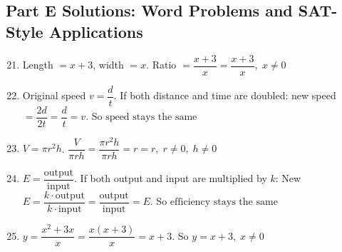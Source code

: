 \documentclass[12pt]{article}
\begin{document}
\subsection*{Part E Solutions: Word Problems and SAT-Style Applications}
\begin{enumerate}
  \setcounter{enumi}{20}
  \item Length \(= x+3\), width \(= x\).  
  Ratio \(= \dfrac{x+3}{x}
  = \boxed{\dfrac{x+3}{x}}, \; x \ne 0\)

  \item Original speed \(v = \dfrac{d}{t}\).  
  If both distance and time are doubled: new speed \(= \dfrac{2d}{2t} = \dfrac{d}{t} = v\).  
  So \(\boxed{\text{speed stays the same}}\)

  \item \(V = \pi r^2 h\).  
  \(\dfrac{V}{\pi r h}
  = \dfrac{\pi r^2 h}{\pi r h}
  = r
  = \boxed{r}, \; r \ne 0,\; h \ne 0\)

  \item \(E = \dfrac{\text{output}}{\text{input}}\).  
  If both output and input are multiplied by \(k\):  
  New \(E = \dfrac{k \cdot \text{output}}{k \cdot \text{input}}
  = \dfrac{\text{output}}{\text{input}}
  = E\).  
  So \(\boxed{\text{efficiency stays the same}}\)

  \item \(y = \dfrac{x^2 + 3x}{x}
  = \dfrac{x(x+3)}{x}
  = x+3\).  
  So \(y = \boxed{x+3}, \; x \ne 0\)
\end{enumerate}
\end{document}
